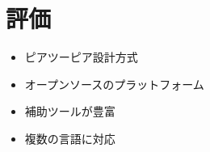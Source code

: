 
\chapter{評価}
\label{cha:evaluation}


\begin{itemize}
 \item ピアツーピア設計方式
 \item オープンソースのプラットフォーム
 \item 補助ツールが豊富
 \item 複数の言語に対応
\end{itemize}












